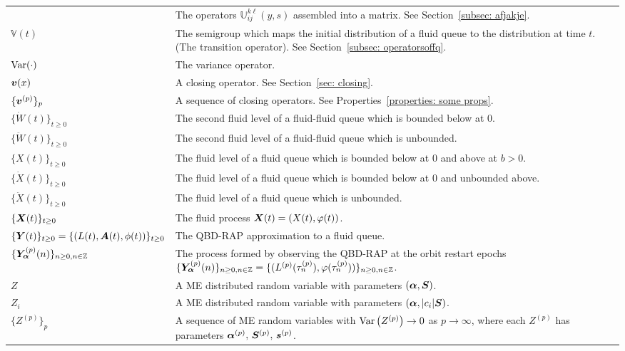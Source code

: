 \begin{longtable}{p{}p{}}
      & The operators \(\mathbb{U}_{ij}^{k\ell}(y,s)\) assembled into a matrix. See Section~\ref{subsec: afjakje}.\\
  \(\mathbb V(t)\) 
      & The semigroup which maps the initial distribution of a fluid queue to the distribution at time \(t\). (The transition operator). See Section~\ref{subsec: operatorsoffq}. \\
  \(\mathrm{Var}(\cdot)\) 
      & The variance operator. \\ 
  \(\boldsymbol v(x)\)
      & A closing operator. See Section~\ref{sec: closing}. \\
  \(\{\boldsymbol v^{(p)}\}_p \)
      & A sequence of closing operators. See Properties~\ref{properties: some props}. \\
  \(\{\dot W(t)\}_{t\geq 0}\) 
      & The second fluid level of a fluid-fluid queue which is bounded below at 0.  \\
  \(\{\ddot W(t)\}_{t\geq 0}\) 
      & The second fluid level of a fluid-fluid queue which is unbounded.  \\
  \(\{X(t)\}_{t\geq 0}\)   
      & The fluid level of a fluid queue which is bounded below at \(0\) and above at \(b>0\).  \\
  \(\{\dot X(t)\}_{t\geq 0}\)   
      & The fluid level of a fluid queue which is bounded below at \(0\) and unbounded above.  \\
  \(\{\ddot X(t)\}_{t\geq 0}\)   
      & The fluid level of a fluid queue which is unbounded.  \\
  \(\{\boldsymbol X(t)\}_{t\geq 0}\) & The fluid process \(\boldsymbol X(t)=(X(t),\varphi(t))\). \\
  \(\{\boldsymbol Y(t)\}_{t\geq0}=\{(L(t), \boldsymbol A(t), \phi(t))\}_{t\geq 0}\) 
      & The QBD-RAP approximation to a fluid queue. \\ 
  \(\{\bm{Y}_{\bm{\alpha}}^{(p)}(n)\}_{n\geq 0, n \in \mathbb Z}\)
      & The process formed by observing the QBD-RAP at the orbit restart epochs \(\{\bm{Y}_{\bm{\alpha}}^{(p)}(n)\}_{n\geq 0, n \in \mathbb Z}=\{(L^{(p)}(\tau_n^{(p)}),\varphi(\tau_n^{(p)}))\}_{n\geq 0, n \in \mathbb Z}\). \\
  \(Z\) 
      & A ME distributed random variable with parameters \((\boldsymbol \alpha, \boldsymbol S)\). \\ 
  \(Z_i\) 
      & A ME distributed random variable with parameters \((\boldsymbol \alpha, |c_i|\boldsymbol S)\). \\ 
  \(\{Z^{(p)}\}_{p}\) 
      & A sequence of ME random variables with \(\mathrm{Var}\left(Z^{(p)}\right)\to 0\) as \(p\to \infty\), where each 
      \(Z^{(p)}\) has parameters \(\boldsymbol \alpha^{(p)},\, \boldsymbol S^{(p)},\, \boldsymbol s^{(p)}\). \\
\end{longtable}